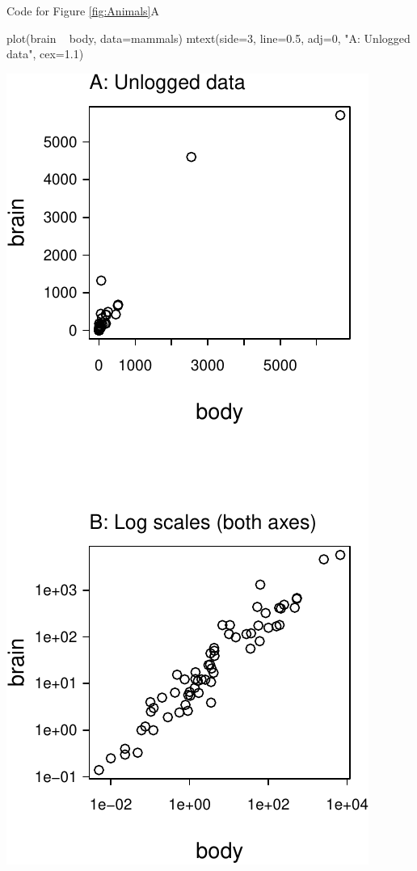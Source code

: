 \documentclass{tufte-book}\usepackage[]{graphicx}\usepackage[]{color}
\begin{document}
Code for Figure \ref{fig:Animals}A
\begin{Schunk}
\begin{Sinput}
plot(brain ~ body, data=mammals)
mtext(side=3, line=0.5, adj=0,
      "A: Unlogged data", cex=1.1)
\end{Sinput}
\end{Schunk}

\begin{marginfigure}
\begin{Schunk}


\centerline{\includegraphics[width=\textwidth]{figs/03-bbAB-1} }


\end{Schunk}
\end{marginfigure}
\end{document}
